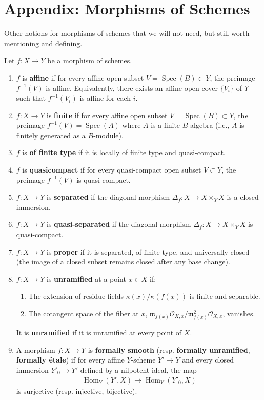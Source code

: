 \documentclass[12pt]{article}
\begin{document}
\section{Appendix: Morphisms of Schemes}
Other notions for morphisms of schemes that we will not need, but still worth mentioning and defining.
\begin{definition}
    Let $f: X \to Y$ be a morphism of schemes.
    \begin{enumerate}
        \item $f$ is \textbf{affine} if for every affine open subset $V = \operatorname{Spec}(B) \subset Y$, the preimage $f^{-1}(V)$ is affine. Equivalently, there exists an affine open cover $\{V_i\}$ of $Y$ such that $f^{-1}(V_i)$ is affine for each $i$.
        \item $f: X \to Y$ is \textbf{finite} if for every affine open subset $V = \operatorname{Spec}(B) \subset Y$, the preimage $f^{-1}(V) = \operatorname{Spec}(A)$ where $A$ is a finite $B$-algebra (i.e., $A$ is finitely generated as a $B$-module).
        \item $f$ is \textbf{of finite type} if it is locally of finite type and quasi-compact.

        \item $f$ is \textbf{quasicompact} if for every quasi-compact open subset $V \subset Y$, the preimage $f^{-1}(V)$ is quasi-compact.
        \item $f: X \to Y$ is \textbf{separated} if the diagonal morphism $\Delta_f: X \to X \times_Y X$ is a closed immersion.
        \item $f: X \to Y$ is \textbf{quasi-separated} if the diagonal morphism $\Delta_f: X \to X \times_Y X$ is quasi-compact.
        \item $f: X \to Y$ is \textbf{proper} if it is separated, of finite type, and universally closed (the image of a closed subset remains closed after any base change).
        \item $f: X \to Y$ is \textbf{unramified} at a point $x \in X$ if:
              \begin{enumerate}
                  \item The extension of residue fields $\kappa(x)/\kappa(f(x))$ is finite and separable.
                  \item The cotangent space of the fiber at $x$, $\mathfrak{m}_{f(x)}\mathcal{O}_{X,x}/\mathfrak{m}_{f(x)}^2\mathcal{O}_{X,x}$, vanishes.
              \end{enumerate}
              It is \textbf{unramified} if it is unramified at every point of $X$.
        \item A morphism $f: X \to Y$ is \textbf{formally smooth} (resp. \textbf{formally unramified}, \textbf{formally étale}) if for every affine $Y$-scheme $Y' \to Y$ and every closed immersion $Y'_0 \to Y'$ defined by a nilpotent ideal, the map
              \begin{align*}
                  \operatorname{Hom}_Y(Y', X) \to \operatorname{Hom}_Y(Y'_0, X)
              \end{align*}
              is surjective (resp. injective, bijective).


\end{enumerate}
\end{definition}
\end{document}
